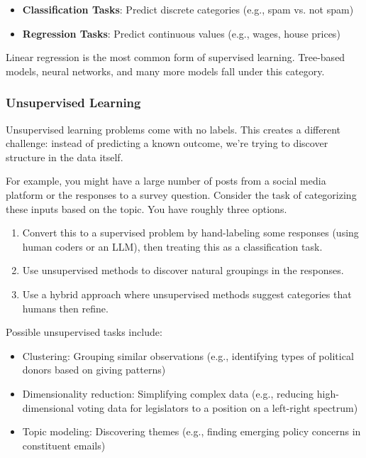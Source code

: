 \begin{itemize}
\item \textbf{Classification Tasks}: Predict discrete categories (e.g., spam vs. not spam)
\item \textbf{Regression Tasks}: Predict continuous values (e.g., wages, house prices)
\end{itemize}

Linear regression is the most common form of supervised learning. Tree-based models, neural networks, and many more models fall under this category.

\subsubsection{Unsupervised Learning}

Unsupervised learning problems come with no labels. This creates a different challenge: instead of predicting a known outcome, we're trying to discover structure in the data itself.

For example, you might have a large number of posts from a social media platform or the responses to a survey question. Consider the task of categorizing these inputs based on the topic. You have roughly three options.

\begin{enumerate}
\item Convert this to a supervised problem by hand-labeling some responses (using human coders or an LLM), then treating this as a classification task.
\item Use unsupervised methods to discover natural groupings in the responses.
\item Use a hybrid approach where unsupervised methods suggest categories that humans then refine.
\end{enumerate}

Possible unsupervised tasks include:

\begin{itemize}
\item Clustering: Grouping similar observations (e.g., identifying types of political donors based on giving patterns)
\item Dimensionality reduction: Simplifying complex data (e.g., reducing high-dimensional voting data for legislators to a position on a left-right spectrum)
\item Topic modeling: Discovering themes (e.g., finding emerging policy concerns in constituent emails)
\end{itemize}

